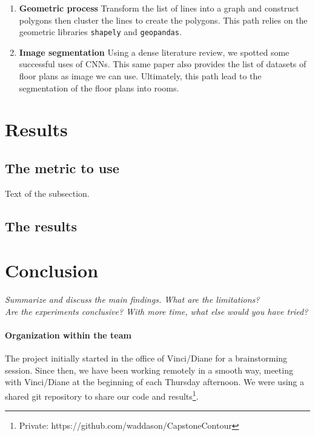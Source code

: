 \documentclass[11pt]{article}
\begin{document}
\begin{enumerate}
    \item \textbf{Geometric process} Transform the list of lines into a graph and 
    construct polygons \cite{Schafer2011AutomaticGO} then cluster the lines to 
    create the polygons\cite{dominguez2012Semiautomaticdetection}. This path relies on the
    geometric libraries \texttt{shapely} and \texttt{geopandas}. 
    \item \textbf{Image segmentation} Using a dense literature review\cite{PIZARRO2022104348}, we 
    spotted some successful uses of CNNs\cite{ijgi10020097}. This same paper also provides the list
    of datasets of floor plans as image we can use. Ultimately, this path lead
    to the segmentation of the floor plans into rooms.
\end{enumerate}

\section{Results}

\subsection{The metric to use}
Text of the subsection.

\subsection{The results}

\section{Conclusion}
\textit{Summarize and discuss the main findings. What are the limitations?\\
Are the experiments conclusive? With more time, what else would you have tried?}

\paragraph{Organization within the team}
The project initially started in the office of Vinci/Diane for a brainstorming session.
Since then, we have been working remotely in a smooth way, meeting with 
Vinci/Diane at the beginning of each Thursday afternoon. We were using a shared 
git repository to share our code and results\footnote{Private: https://github.com/waddason/CapstoneContour}.
\end{document}
